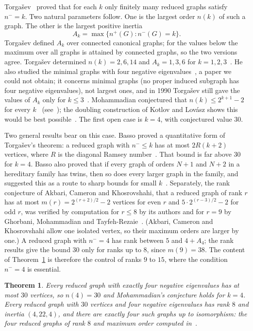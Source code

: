 \documentclass[11pt]{amsart}
\newtheorem{theorem}{Theorem}[section]
\theoremstyle{definition}
\theoremstyle{remark}
\begin{document}
Torga\v{s}ev~\cite{Torgasev1985finite} proved that for each $k$ only finitely many reduced graphs satisfy $n^-=k$. Two natural parameters follow. One is the largest order $n(k)$ of such a graph. The other is the largest positive inertia
\[
A_k=\max\{n^+(G): n^-(G)=k\}.
\]
Torga\v{s}ev defined $A_k$ over connected canonical graphs; for the values below the maximum over all graphs is attained by connected graphs, so the two versions agree. Torga\v{s}ev determined $n(k)=2,6,14$ and $A_k=1,3,6$ for $k=1,2,3$~\cite{Torgasev1985two,Torgasev1989,Torgasev1992,AEKPT2026}. He also studied the minimal graphs with four negative eigenvalues~\cite{Torgasev1987}, a paper we could not obtain; it concerns minimal graphs (no proper induced subgraph has four negative eigenvalues), not largest ones, and in 1990 Torga\v{s}ev still gave the values of $A_k$ only for $k\le3$~\cite{Torgasev1992}. Mohammadian conjectured that $n(k)\le 2^{k+1}-2$ for every $k$~\cite{Mohammadian2022} (see~\cite[Conjecture~2.2]{AEKPT2026}); the doubling construction of Kotlov and Lov\'asz shows this would be best possible~\cite{KotlovLovasz1996,AEKPT2026}. The first open case is $k=4$, with conjectured value $30$.

Two general results bear on this case. Basso proved a quantitative form of Torga\v{s}ev's theorem: a reduced graph with $n^-\le k$ has at most $2R(k+2)$ vertices, where $R$ is the diagonal Ramsey number~\cite[Theorem~1.1]{Basso2021}. That bound is far above $30$ for $k=4$. Basso also proved that if every graph of orders $N+1$ and $N+2$ in a hereditary family has twins, then so does every larger graph in the family, and suggested this as a route to sharp bounds for small $k$~\cite[Proposition~1.3]{Basso2021}. Separately, the rank conjecture of Akbari, Cameron and Khosrovshahi, that a reduced graph of rank $r$ has at most $m(r)=2^{(r+2)/2}-2$ vertices for even $r$ and $5\cdot2^{(r-3)/2}-2$ for odd $r$, was verified by computation for $r\le8$ by its authors and for $r=9$ by Ghorbani, Mohammadian and Tayfeh-Rezaie~\cite{ACK2004,GMT2015}. (Akbari, Cameron and Khosrovshahi allow one isolated vertex, so their maximum orders are larger by one.) A reduced graph with $n^-=4$ has rank between $5$ and $4+A_4$; the rank results give the bound $30$ only for ranks up to $8$, since $m(9)=38$. The content of Theorem~\ref{thm:order} is therefore the control of ranks $9$ to $15$, where the condition $n^-=4$ is essential.

\begin{theorem}\label{thm:order}
Every reduced graph with exactly four negative eigenvalues has at most $30$ vertices, so $n(4)=30$ and Mohammadian's conjecture holds for $k=4$. Every reduced graph with $30$ vertices and four negative eigenvalues has rank $8$ and inertia $(4,22,4)$, and there are exactly four such graphs up to isomorphism: the four reduced graphs of rank $8$ and maximum order computed in~\cite[Table~1]{ACK2004}.
\end{theorem}
\end{document}
